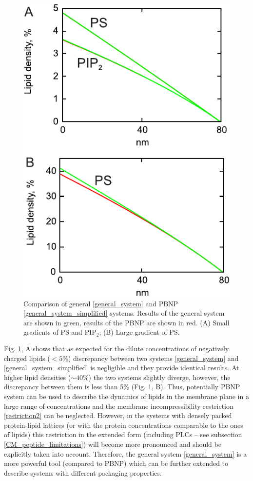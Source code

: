 \begin{figure}[!ht]
\centering
  \includegraphics[scale=1.1]{../figures/single_grad_gen_pbnp_comparison.pdf}

\caption[Comparison of general and PBNP systems]{Comparison of general \eqref{general_system} and PBNP \eqref{general_system_simplified} systems. Results of the general system are shown in green, results of the PBNP are shown in red. (A) Small gradients of PS and PIP$_2$; (B) Large gradient of PS.}
\label{fig:single_grad_gen_pbnp_comparison}
\end{figure}

Fig. \ref{fig:single_grad_gen_pbnp_comparison}, A shows that as expected for the dilute concentrations of negatively charged lipids ($<5\%$) discrepancy between two systems \eqref{general_system} and \eqref{general_system_simplified} is negligible and they provide identical results. At higher lipid densities ($\sim 40\%$) the two systems slightly diverge, however, the discrepancy between them is less than 5\% (Fig. \ref{fig:single_grad_gen_pbnp_comparison}, B). Thus, potentially PBNP system can be used to describe the dynamics of lipids in the membrane plane in a large range of concentrations and the membrane incompressibility restriction \eqref{restriction2} can be neglected. However, in the systems with densely packed protein-lipid lattices (or with the protein concentrations comparable to the ones of lipids) this restriction in the extended form (including PLCs -- see subsection \ref{CM_peptide_limitations}) will become more pronounced and should be explicitly taken into account. Therefore, the general system \eqref{general_system} is a more powerful tool (compared to PBNP) which can be further extended to describe systems with different packaging properties.

